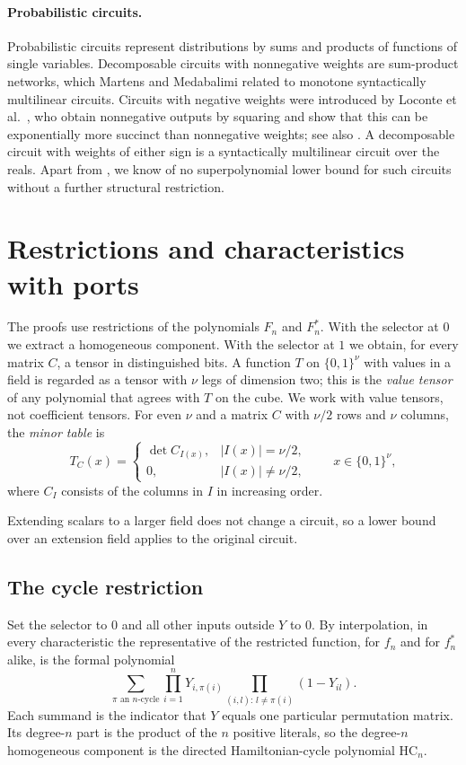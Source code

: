 \documentclass[11pt]{article}
\theoremstyle{remark}
\newcommand{\HC}{\mathrm{HC}}
\begin{document}
\paragraph{Probabilistic circuits.}
Probabilistic circuits \cite{cvv} represent distributions by sums and
products of functions of single variables. Decomposable circuits with
nonnegative weights are sum-product networks, which Martens and
Medabalimi \cite{mm} related to monotone syntactically multilinear
circuits. Circuits with negative weights were introduced by Loconte et
al.\ \cite{lsm}, who obtain nonnegative outputs by squaring and show that
this can be exponentially more succinct than nonnegative weights; see
also \cite{lmv}. A decomposable circuit with weights of either sign is a
syntactically multilinear circuit over the reals. Apart from \cite{hc},
we know of no superpolynomial lower bound for such circuits without a
further structural restriction.

\section{Restrictions and characteristics with ports}\label{sec:common}
The proofs use restrictions of the polynomials \(F_n\) and \(F^*_n\). With
the selector at \(0\) we extract a homogeneous component. With the
selector at \(1\) we obtain, for every matrix \(C\), a tensor in
distinguished bits.
A function \(T\) on \(\{0,1\}^{\nu}\) with values in a field is regarded
as a tensor with \(\nu\) legs of dimension two; this is the \emph{value
tensor} of any polynomial that agrees with \(T\) on the cube. We work with
value tensors, not coefficient tensors. For even \(\nu\) and a matrix
\(C\) with \(\nu/2\) rows and \(\nu\) columns, the \emph{minor table} is
\begin{equation}\label{eq:minor}
 T_C(x)=
 \begin{cases}\det C_{I(x)},& |I(x)|=\nu/2,\\0,& |I(x)|\ne \nu/2,\end{cases}
 \qquad x\in\{0,1\}^{\nu},
\end{equation}
where \(C_I\) consists of the columns in \(I\) in increasing order.

Extending scalars to a larger field does not change a circuit, so a lower
bound over an extension field applies to the original circuit.

\subsection{The cycle restriction}\label{sec:cycle}
Set the selector to \(0\) and all other inputs outside \(Y\) to \(0\).
By interpolation, in every characteristic the representative of the
restricted function, for \(f_n\) and for \(f^*_n\) alike, is the formal
polynomial
\[
 \sum_{\pi\text{ an }n\text{-cycle}}
      \prod_{i=1}^n Y_{i,\pi(i)}
      \prod_{(i,l):\,l\ne\pi(i)}(1-Y_{il}).
\]
Each summand
is the indicator that \(Y\) equals one particular permutation matrix. Its
degree-\(n\) part is the product of the \(n\) positive literals, so the
degree-\(n\) homogeneous component is the directed Hamiltonian-cycle
polynomial \(\HC_n\).
\end{document}

